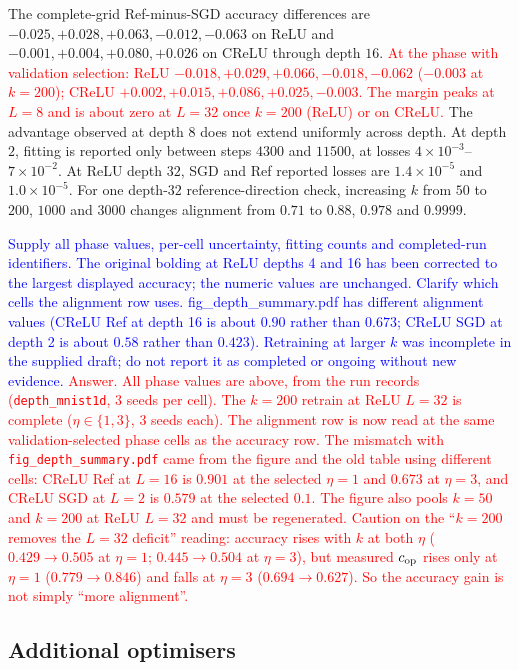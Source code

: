 \documentclass{article}
\newcommand{\zied}[1]{\textcolor{blue}{#1}}
\newcommand{\nat}[1]{\textcolor{red}{#1}}
\theoremstyle{definition}
\theoremstyle{remark}
\begin{document}
The complete-grid Ref-minus-SGD accuracy differences are $-0.025,+0.028,+0.063,-0.012,-0.063$ on ReLU and $-0.001,+0.004,+0.080,+0.026$ on CReLU through depth $16$. \nat{At the phase with validation selection: ReLU $-0.018,+0.029,+0.066,-0.018,-0.062$ ($-0.003$ at $k{=}200$); CReLU $+0.002,+0.015,+0.086,+0.025,-0.003$. The margin peaks at $L=8$ and is about zero at $L=32$ once $k=200$ (ReLU) or on CReLU.} The advantage observed at depth $8$ does not extend uniformly across depth. At depth $2$, fitting is reported only between steps $4300$ and $11500$, at losses $4\times10^{-3}$--$7\times10^{-2}$. At ReLU depth $32$, SGD and Ref reported losses are $1.4\times10^{-5}$ and $1.0\times10^{-5}$. For one depth-$32$ reference-direction check, increasing $k$ from $50$ to $200$, $1000$ and $3000$ changes alignment from $0.71$ to $0.88$, $0.978$ and $0.9999$.

\zied{Supply all phase values, per-cell uncertainty, fitting counts and completed-run identifiers. The original bolding at ReLU depths 4 and 16 has been corrected to the largest displayed accuracy; the numeric values are unchanged. Clarify which cells the alignment row uses. fig\_depth\_summary.pdf has different alignment values (CReLU Ref at depth 16 is about $0.90$ rather than $0.673$; CReLU SGD at depth 2 is about $0.58$ rather than $0.423$). Retraining at larger $k$ was incomplete in the supplied draft; do not report it as completed or ongoing without new evidence.}
\nat{Answer. All phase values are above, from the run records (\texttt{depth\_mnist1d}, $3$ seeds per cell). The $k=200$ retrain at ReLU $L=32$ is complete ($\eta\in\{1,3\}$, $3$ seeds each). The alignment row is now read at the same validation-selected phase cells as the accuracy row. The mismatch with \texttt{fig\_depth\_summary.pdf} came from the figure and the old table using different cells: CReLU Ref at $L=16$ is $0.901$ at the selected $\eta=1$ and $0.673$ at $\eta=3$, and CReLU SGD at $L=2$ is $0.579$ at the selected $0.1$. The figure also pools $k=50$ and $k=200$ at ReLU $L=32$ and must be regenerated. Caution on the ``$k=200$ removes the $L=32$ deficit'' reading: accuracy rises with $k$ at both $\eta$ ($0.429\to0.505$ at $\eta=1$; $0.445\to0.504$ at $\eta=3$), but measured $c_{\rm op}$ rises only at $\eta=1$ ($0.779\to0.846$) and falls at $\eta=3$ ($0.694\to0.627$). So the accuracy gain is not simply ``more alignment''.}

\subsection{Additional optimisers}\label{app:e18}
\end{document}
